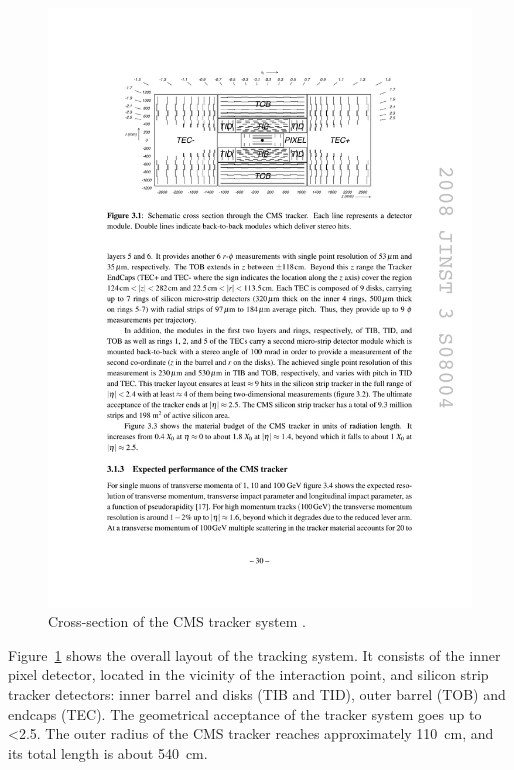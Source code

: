 \begin{figure}[htbp]
  \begin{center}
    \leavevmode
    \includegraphics[width=\columnwidth]{tracker}
    \caption{Cross-section of the CMS tracker system \cite{CMS}.}
    \label{Tracker}
  \end{center}
\end{figure}

Figure~\ref{Tracker} shows the overall layout of the tracking system. It consists of the inner pixel detector, located
in the vicinity of the interaction point, and silicon strip tracker detectors: inner barrel and disks (TIB and TID),
outer barrel (TOB) and endcaps (TEC). The geometrical acceptance of the tracker system goes up to \abs\eta \num{<2.5}.
The outer radius of the CMS tracker reaches approximately \SI{110}{\cm}, and its total length is about \SI{540}{\cm}.

